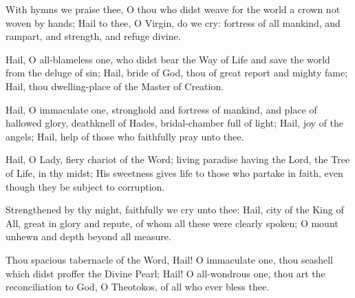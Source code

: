 \documentclass[twoside, letterpaper, 12pt]{report}
\begin{document}

With hymns we praise thee, O thou who didst weave for the world a crown not woven by hands;
Hail to thee, O Virgin, do we cry: fortress of all mankind,
and rampart, and strength, and refuge divine.





Hail, O all-blameless one,
who didst bear the Way of Life and save the world from the deluge of sin;
Hail, bride of God, thou of great report and mighty fame;
Hail, thou dwelling-place of the Master of Creation.


Hail, O immaculate one, stronghold and fortress of mankind,
and place of hallowed glory, deathknell of Hades, bridal-chamber full of light;
Hail, joy of the angels;
Hail, help of those who faithfully pray unto thee.


Hail, O Lady, fiery chariot of the Word;
living paradise having the Lord, the Tree of Life, in thy midst;
His sweetness gives life to those who partake in faith,
even though they be subject to corruption.


Strengthened by thy might, faithfully we cry unto thee:
Hail, city of the King of All, great in glory and repute,
of whom all these were clearly spoken;
O mount unhewn and depth beyond all measure.


Thou spacious tabernacle of the Word,
Hail! O immaculate one, thou seashell which didst proffer the Divine Pearl;
Hail! O all-wondrous one, thou art the reconciliation to God,
O Theotokos, of all who ever bless thee.




\end{document}
